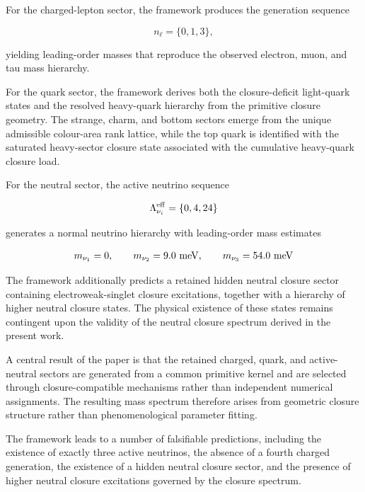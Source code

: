 \documentclass[11pt]{article}
\theoremstyle{definition}
\theoremstyle{remark}
\begin{document}
For the charged-lepton sector, the framework produces the
generation sequence

\begin{equation}
n_\ell
=
\{0,1,3\},
\end{equation}

yielding leading-order masses that reproduce the observed
electron, muon, and tau mass hierarchy.

For the quark sector, the framework derives both the
closure-deficit light-quark states and the resolved heavy-quark
hierarchy from the primitive closure geometry. The strange,
charm, and bottom sectors emerge from the unique admissible
colour-area rank lattice, while the top quark is identified
with the saturated heavy-sector closure state associated with
the cumulative heavy-quark closure load.

For the neutral sector, the active neutrino sequence

\begin{equation}
\Lambda_{\nu_i}^{\rm eff}
=
\{0,4,24\}
\end{equation}

generates a normal neutrino hierarchy with leading-order mass
estimates

\begin{equation}
m_{\nu_1}=0,
\qquad
m_{\nu_2}=9.0~{\rm meV},
\qquad
m_{\nu_3}=54.0~{\rm meV}
\end{equation}

The framework additionally predicts a retained hidden neutral
closure sector containing electroweak-singlet closure
excitations, together with a hierarchy of higher neutral
closure states. The physical existence of these states remains
contingent upon the validity of the neutral closure spectrum
derived in the present work.

A central result of the paper is that the retained charged,
quark, and active-neutral sectors are generated from a common
primitive kernel and are selected through closure-compatible
mechanisms rather than independent numerical assignments. The
resulting mass spectrum therefore arises from geometric closure
structure rather than phenomenological parameter fitting.

The framework leads to a number of falsifiable predictions,
including the existence of exactly three active neutrinos, the
absence of a fourth charged generation, the existence of a
hidden neutral closure sector, and the presence of higher
neutral closure excitations governed by the closure spectrum.
\end{document}
